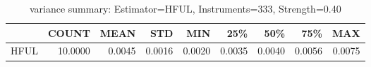 \begin{table}[ht]
\centering
\caption{variance summary: Estimator=HFUL, Instruments=333, Strength=0.40}
\begin{tabular}{lrrrrrrrr}
\toprule
 & COUNT & MEAN & STD & MIN & 25\% & 50\% & 75\% & MAX \\
\midrule
HFUL & 10.0000 & 0.0045 & 0.0016 & 0.0020 & 0.0035 & 0.0040 & 0.0056 & 0.0075 \\
\bottomrule
\end{tabular}
\end{table}
